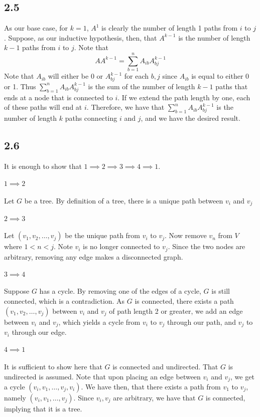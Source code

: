 \documentclass[letterpaper,12pt]{article}
\theoremstyle{definition}
\begin{document}
\subsection*{2.5}
As our base case, for $k=1$, $A^1$ is clearly the number of length 1 paths from $i$ to $j$. Suppose, as our inductive hypothesis, then, that $A^{k-1}$ is the number of length $k-1$ paths from $i$ to $j$. Note that
\[ AA^{k-1} = \sum^{n}_{b=1} A_{ib}A_{bj}^{k-1}\]
Note that $A_{ib}$ will either be 0 or $A_{bj}^{k-1}$ for each $b,j$ since $A_{ib}$ is equal to either 0 or 1. Thus $\sum^{n}_{b=1} A_{ib}A_{bj}^{k-1}$
is the sum of the number of length $k-1$ paths that ends at a node that is connected to $i$.
If we extend the path length by one, each of these paths will end at $i$. Therefore, we have that 
$ \sum^{n}_{b=1} A_{ib}A_{bj}^{k-1}$ is the number of length $k$ paths connecting $i$ and $j$, and we have the desired result.

\subsection*{2.6}
It is enough to show that $1 \implies 2 \implies 3 \implies 4 \implies 1$.
\\\\$1 \implies 2$ \\\\
Let $G$ be a tree. By definition of a tree, there is a unique path between $v_i$ and $v_j$
\\\\$2 \implies 3$ \\\\
Let $(v_1,v_2,\dots,v_j)$ be the unique path from $v_i$ to $v_j$. Now remove $v_n$ from $V$ where $1< n < j$. 
Note $v_i$ is no longer connected to $v_j$. Since the two nodes are arbitrary, removing any edge makes a disconnected graph.
\\\\$3 \implies 4$ \\\\
Suppose $G$ has a cycle. By removing one of the edges of a cycle, $G$ is still connected, which is a contradiction. As $G$ is connected, there exists a path $(v_1,v_2,\dots,v_j)$ between $v_i$ and $v_j$ of path length 2 or greater, we add an edge between $v_i$ and $v_j$, which yields a cycle from $v_i$ to $v_j$ through our path, and $v_j$ to $v_i$ through our edge.
\\\\$4 \implies 1$ \\\\
It is sufficient to show here that $G$ is connected and undirected. That $G$ is undirected is assumed. Note that upon placing an edge between $v_i$ and $v_j$, we get a cycle $(v_i, v_1, \dots, v_j, v_i)$. We have then, that there exists a path from $v_1$ to $v_j$, namely $(v_i, v_1,\dots, v_j)$. Since $v_i, v_j$ are arbitrary, we have that $G$ is connected, implying that it is a tree.
\end{document}
